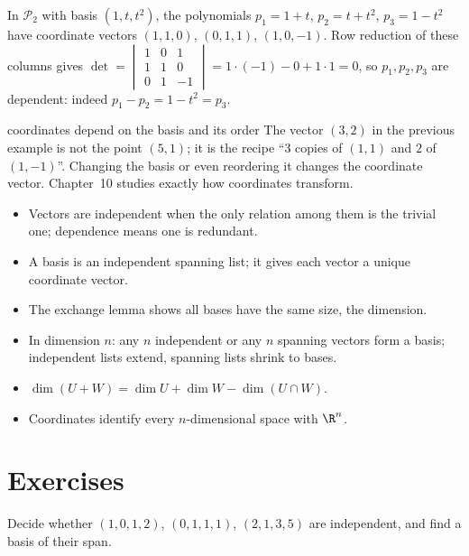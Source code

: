 \begin{example}
In $\mathcal{P}_2$ with basis $(1,t,t^2)$, the polynomials $p_1=1+t$, $p_2=t+t^2$, $p_3=1-t^2$ have coordinate vectors $(1,1,0)$, $(0,1,1)$, $(1,0,-1)$. Row reduction of these columns gives $\det=\begin{vmatrix}1&0&1\\1&1&0\\0&1&-1\end{vmatrix}=1\cdot(-1)-0+1\cdot1=0$, so $p_1,p_2,p_3$ are dependent: indeed $p_1-p_2=1-t^2=p_3$.
\end{example}

\begin{pitfall}{coordinates depend on the basis and its order}
The vector $(3,2)$ in the previous example is not the point $(5,1)$; it is the recipe ``$3$ copies of $(1,1)$ and $2$ of $(1,-1)$''. Changing the basis or even reordering it changes the coordinate vector. Chapter~10 studies exactly how coordinates transform.
\end{pitfall}

\begin{summarybox}
\begin{itemize}
  \item Vectors are independent when the only relation among them is the trivial one; dependence means one is redundant.
  \item A basis is an independent spanning list; it gives each vector a unique coordinate vector.
  \item The exchange lemma shows all bases have the same size, the dimension.
  \item In dimension $n$: any $n$ independent or any $n$ spanning vectors form a basis; independent lists extend, spanning lists shrink to bases.
  \item $\dim(U+W)=\dim U+\dim W-\dim(U\cap W)$.
  \item Coordinates identify every $n$-dimensional space with $\R^n$.
\end{itemize}
\end{summarybox}

\section{Exercises}

\begin{exercise}
Decide whether $(1,0,1,2)$, $(0,1,1,1)$, $(2,1,3,5)$ are independent, and find a basis of their span.
\end{exercise}

